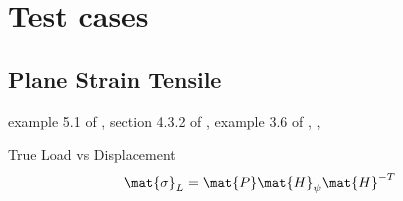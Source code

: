 \section{Test cases}
\subsection{Plane Strain Tensile}
example 5.1 of \cite{Armero2003}, section 4.3.2 of \cite{Simo1992}, example 3.6 of \cite{DeSouzaNeto1996}, \cite{Simo1985}, \cite{Tvergaard1981}

\bigbreak

True Load vs Displacement
\begin{equation}
	\mat{\sigma}_L = \mat{P}\mat{H}_{\psi}\mat{H}^{-T}
\end{equation}



